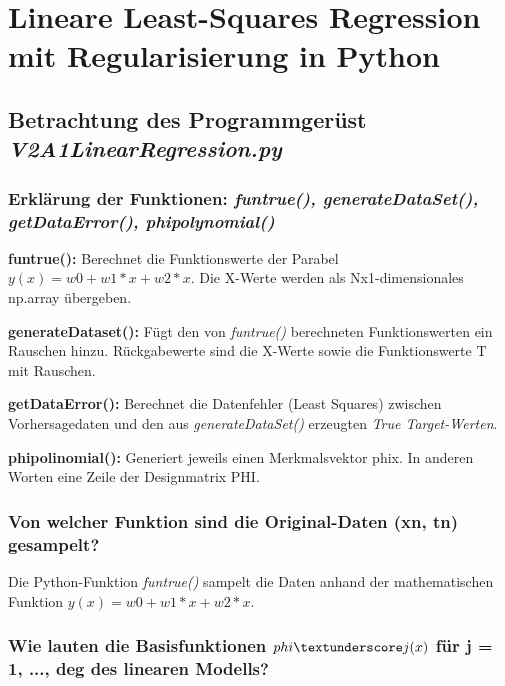 \section{Lineare Least-Squares Regression mit Regularisierung in Python}


\subsection{
    Betrachtung des Programmgerüst \textit{V2A1\textunderscore LinearRegression.py}
}

\subsubsection{Erklärung der Funktionen: \textit{fun\textunderscore true(), generateDataSet(), getDataError(), phi\textunderscore polynomial()}}

\textbf{fun\textunderscore true():} Berechnet die Funktionswerte der Parabel
$y(x) = w0 + w1*x + w2*x$. Die X-Werte werden als Nx1-dimensionales np.array übergeben.

\vspace{5px}
\noindent
\textbf{generateDataset():} Fügt den von \textit{fun\textunderscore true()} berechneten Funktionswerten ein Rauschen hinzu. Rückgabewerte sind die X-Werte sowie die Funktionswerte T mit Rauschen.

\vspace{5px}
\noindent
\textbf{getDataError():} Berechnet die Datenfehler (Least Squares) zwischen Vorhersagedaten und den aus \textit{generateDataSet()} erzeugten \textit{True Target-Werten}.

\vspace{5px}
\noindent
\textbf{phi\textunderscore polinomial():} Generiert jeweils einen Merkmalsvektor phi\textunderscore x. In anderen Worten eine Zeile der Designmatrix PHI.

\subsubsection{Von welcher Funktion sind die Original-Daten (xn, tn) gesampelt?}

Die Python-Funktion \textit{fun\textunderscore true()} sampelt die Daten anhand der mathematischen Funktion $y(x) = w0 + w1*x + w2*x$.

\subsubsection{Wie lauten die Basisfunktionen $phi\textunderscore j(x)$ für j = 1, ..., deg des linearen Modells?}

